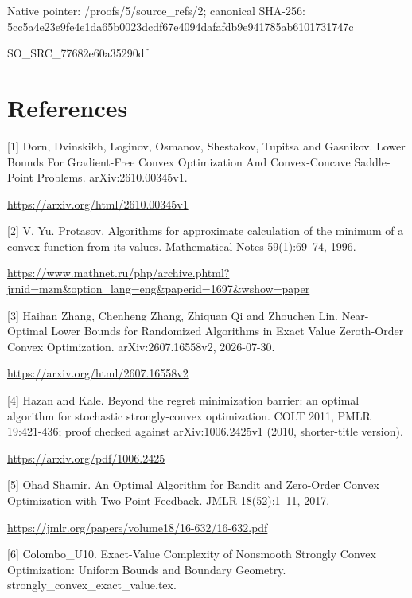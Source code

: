 \documentclass[10pt,a4paper]{article}
\begin{document}
Native pointer: /proofs/5/source\_refs/2; canonical SHA-256: 5cc5a4e23e9fe4e1da65b002\allowbreak{}3dcdf67e4094dafafdb9e941\allowbreak{}785ab6101731747c


SO\_SRC\_77682e60a35290df


\section{References}


[1] Dorn, Dvinskikh, Loginov, Osmanov, Shestakov, Tupitsa and Gasnikov. Lower Bounds For Gradient-Free Convex Optimization And Convex-Concave Saddle-Point Problems. arXiv:2610.00345v1.



\url{https://arxiv.org/html/2610.00345v1}



[2] V. Yu. Protasov. Algorithms for approximate calculation of the minimum of a convex function from its values. Mathematical Notes 59(1):69--74, 1996.



\url{https://www.mathnet.ru/php/archive.phtml?jrnid=mzm&option_lang=eng&paperid=1697&wshow=paper}



[3] Haihan Zhang, Chenheng Zhang, Zhiquan Qi and Zhouchen Lin. Near-Optimal Lower Bounds for Randomized Algorithms in Exact Value Zeroth-Order Convex Optimization. arXiv:2607.16558v2, 2026-07-30.



\url{https://arxiv.org/html/2607.16558v2}



[4] Hazan and Kale. Beyond the regret minimization barrier: an optimal algorithm for stochastic strongly-convex optimization. COLT 2011, PMLR 19:421-436; proof checked against arXiv:1006.2425v1 (2010, shorter-title version).



\url{https://arxiv.org/pdf/1006.2425}



[5] Ohad Shamir. An Optimal Algorithm for Bandit and Zero-Order Convex Optimization with Two-Point Feedback. JMLR 18(52):1--11, 2017.



\url{https://jmlr.org/papers/volume18/16-632/16-632.pdf}



[6] Colombo\_U10. Exact-Value Complexity of Nonsmooth Strongly Convex Optimization: Uniform Bounds and Boundary Geometry. strongly\_convex\_exact\_value.tex.
\end{document}
